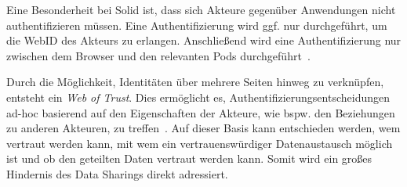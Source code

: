 Eine Besonderheit bei Solid ist, dass sich Akteure gegenüber Anwendungen nicht authentifizieren müssen.
Eine Authentifizierung wird ggf. nur durchgeführt, um die WebID des Akteurs zu erlangen.
Anschließend wird eine Authentifizierung nur zwischen dem Browser und den relevanten Pods durchgeführt~\cite{sambraSolidPlatformDecentralized2016}.

Durch die Möglichkeit, Identitäten über mehrere Seiten hinweg zu verknüpfen, entsteht ein \emph{Web of Trust}.
Dies ermöglicht es, Authentifizierungsentscheidungen ad-hoc basierend auf den Eigenschaften der Akteure, wie bspw. den Beziehungen zu anderen Akteuren, zu treffen~\cite{sambraSolidPlatformDecentralized2016}.
Auf dieser Basis kann entschieden werden, wem vertraut werden kann, mit wem ein vertrauenswürdiger Datenaustausch möglich ist und ob den geteilten Daten vertraut werden kann.
Somit wird ein großes Hindernis des Data Sharings direkt adressiert.

